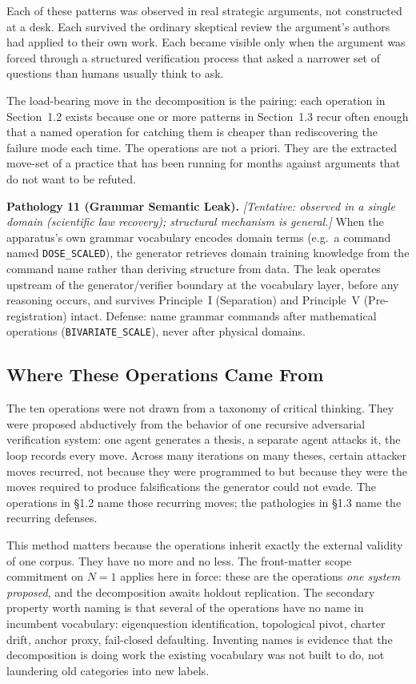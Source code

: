 \documentclass[11pt]{article}
\begin{document}
Each of these patterns was observed in real strategic arguments, not constructed at a desk. Each survived the ordinary skeptical review the argument's authors had applied to their own work. Each became visible only when the argument was forced through a structured verification process that asked a narrower set of questions than humans usually think to ask.

The load-bearing move in the decomposition is the pairing: each operation in Section~1.2 exists because one or more patterns in Section~1.3 recur often enough that a named operation for catching them is cheaper than rediscovering the failure mode each time. The operations are not a priori. They are the extracted move-set of a practice that has been running for months against arguments that do not want to be refuted.

\textbf{Pathology 11 (Grammar Semantic Leak).} \emph{[Tentative: observed in a single domain (scientific law recovery); structural mechanism is general.]} When the apparatus's own grammar vocabulary encodes domain terms (e.g.\ a command named \texttt{DOSE\_SCALED}), the generator retrieves domain training knowledge from the command name rather than deriving structure from data. The leak operates upstream of the generator/verifier boundary at the vocabulary layer, before any reasoning occurs, and survives Principle~I (Separation) and Principle~V (Pre-registration) intact. Defense: name grammar commands after mathematical operations (\texttt{BIVARIATE\_SCALE}), never after physical domains.

\subsection{Where These Operations Came From}

The ten operations were not drawn from a taxonomy of critical thinking. They were proposed abductively from the behavior of one recursive adversarial verification system: one agent generates a thesis, a separate agent attacks it, the loop records every move. Across many iterations on many theses, certain attacker moves recurred, not because they were programmed to but because they were the moves required to produce falsifications the generator could not evade. The operations in \S1.2 name those recurring moves; the pathologies in \S1.3 name the recurring defenses.

This method matters because the operations inherit exactly the external validity of one corpus. They have no more and no less. The front-matter scope commitment on $N{=}1$ applies here in force: these are the operations \emph{one system proposed}, and the decomposition awaits holdout replication. The secondary property worth naming is that several of the operations have no name in incumbent vocabulary: eigenquestion identification, topological pivot, charter drift, anchor proxy, fail-closed defaulting. Inventing names is evidence that the decomposition is doing work the existing vocabulary was not built to do, not laundering old categories into new labels.
\end{document}
